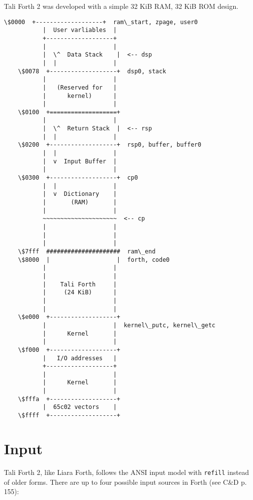 Tali Forth 2 was developed with a simple 32 KiB RAM, 32 KiB ROM design. 

\begin{lstlisting}[frame=single]
    \$0000  +-------------------+  ram\_start, zpage, user0
           |  User varliables  |
           +-------------------+  
           |                   |
           |  \^  Data Stack    |  <-- dsp
           |  |                |
    \$0078  +-------------------+  dsp0, stack
           |                   |
           |   (Reserved for   |
           |      kernel)      |
           |                   |
    \$0100  +===================+  
           |                   |
           |  \^  Return Stack  |  <-- rsp 
           |  |                |
    \$0200  +-------------------+  rsp0, buffer, buffer0
           |  |                |
           |  v  Input Buffer  |
           |                   |
    \$0300  +-------------------+  cp0
           |  |                |
           |  v  Dictionary    |
           |       (RAM)       |
           |                   |
           ~~~~~~~~~~~~~~~~~~~~~  <-- cp
           |                   |
           |                   |
           |                   |
    \$7fff  #####################  ram\_end
    \$8000  |                   |  forth, code0
           |                   |
           |                   |
           |    Tali Forth     |
           |     (24 KiB)      |
           |                   |
           |                   |
    \$e000  +-------------------+
           |                   |  kernel\_putc, kernel\_getc   
           |      Kernel       |
           |                   |
    \$f000  +-------------------+  
           |   I/O addresses   |
           +-------------------+     
           |                   |
           |      Kernel       |
           |                   |
    \$fffa  +-------------------+     
           |  65c02 vectors    |
    \$ffff  +-------------------+     
\end{lstlisting}


\section{Input}

Tali Forth 2, like Liara Forth, follows the ANSI input model with
\texttt{refill} instead of older forms. There are up to four possible input
sources in Forth (see C\&D p. 155):

